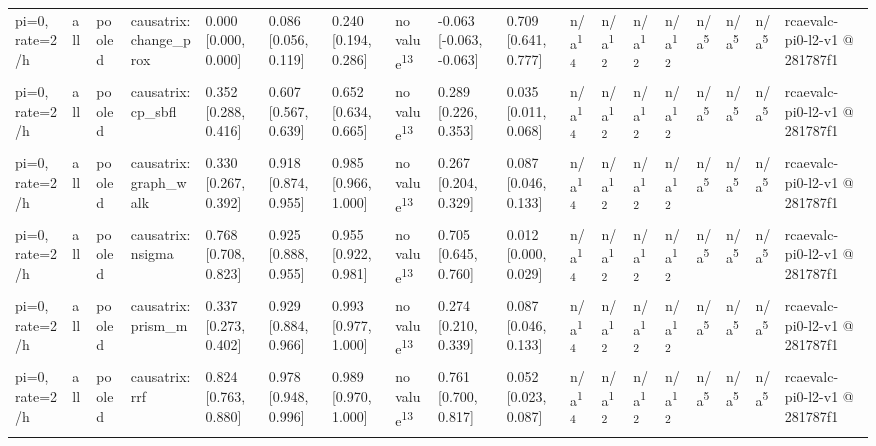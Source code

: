 \begin{table}[t]
\begin{tabular}{llllllllllllllllll}
pi=0, rate=2/h & all & pooled & causatrix:change\_prox & 0.000 [0.000, 0.000] & 0.086 [0.056, 0.119] & 0.240 [0.194, 0.286] & no value\textsuperscript{13} & -0.063 [-0.063, -0.063] & 0.709 [0.641, 0.777] & n/a\textsuperscript{14} & n/a\textsuperscript{12} & n/a\textsuperscript{12} & n/a\textsuperscript{12} & n/a\textsuperscript{5} & n/a\textsuperscript{5} & n/a\textsuperscript{5} & rcaevalc-pi0-l2-v1 @ 281787f1 \\
pi=0, rate=2/h & all & pooled & causatrix:cp\_sbfl & 0.352 [0.288, 0.416] & 0.607 [0.567, 0.639] & 0.652 [0.634, 0.665] & no value\textsuperscript{13} & 0.289 [0.226, 0.353] & 0.035 [0.011, 0.068] & n/a\textsuperscript{14} & n/a\textsuperscript{12} & n/a\textsuperscript{12} & n/a\textsuperscript{12} & n/a\textsuperscript{5} & n/a\textsuperscript{5} & n/a\textsuperscript{5} & rcaevalc-pi0-l2-v1 @ 281787f1 \\
pi=0, rate=2/h & all & pooled & causatrix:graph\_walk & 0.330 [0.267, 0.392] & 0.918 [0.874, 0.955] & 0.985 [0.966, 1.000] & no value\textsuperscript{13} & 0.267 [0.204, 0.329] & 0.087 [0.046, 0.133] & n/a\textsuperscript{14} & n/a\textsuperscript{12} & n/a\textsuperscript{12} & n/a\textsuperscript{12} & n/a\textsuperscript{5} & n/a\textsuperscript{5} & n/a\textsuperscript{5} & rcaevalc-pi0-l2-v1 @ 281787f1 \\
pi=0, rate=2/h & all & pooled & causatrix:nsigma & 0.768 [0.708, 0.823] & 0.925 [0.888, 0.955] & 0.955 [0.922, 0.981] & no value\textsuperscript{13} & 0.705 [0.645, 0.760] & 0.012 [0.000, 0.029] & n/a\textsuperscript{14} & n/a\textsuperscript{12} & n/a\textsuperscript{12} & n/a\textsuperscript{12} & n/a\textsuperscript{5} & n/a\textsuperscript{5} & n/a\textsuperscript{5} & rcaevalc-pi0-l2-v1 @ 281787f1 \\
pi=0, rate=2/h & all & pooled & causatrix:prism\_m & 0.337 [0.273, 0.402] & 0.929 [0.884, 0.966] & 0.993 [0.977, 1.000] & no value\textsuperscript{13} & 0.274 [0.210, 0.339] & 0.087 [0.046, 0.133] & n/a\textsuperscript{14} & n/a\textsuperscript{12} & n/a\textsuperscript{12} & n/a\textsuperscript{12} & n/a\textsuperscript{5} & n/a\textsuperscript{5} & n/a\textsuperscript{5} & rcaevalc-pi0-l2-v1 @ 281787f1 \\
pi=0, rate=2/h & all & pooled & causatrix:rrf & 0.824 [0.763, 0.880] & 0.978 [0.948, 0.996] & 0.989 [0.970, 1.000] & no value\textsuperscript{13} & 0.761 [0.700, 0.817] & 0.052 [0.023, 0.087] & n/a\textsuperscript{14} & n/a\textsuperscript{12} & n/a\textsuperscript{12} & n/a\textsuperscript{12} & n/a\textsuperscript{5} & n/a\textsuperscript{5} & n/a\textsuperscript{5} & rcaevalc-pi0-l2-v1 @ 281787f1 \\

\end{tabular}
\end{table}
